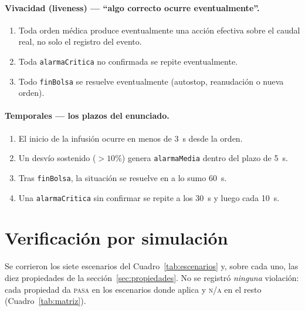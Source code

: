 \documentclass[11pt,a4paper]{article}
\begin{document}
\paragraph{Vivacidad (liveness) --- ``algo correcto ocurre eventualmente''.}
\begin{enumerate}[label=\textbf{L\arabic*.},leftmargin=2.6em]
  \item Toda orden médica produce eventualmente una acción efectiva sobre el caudal real, no solo el registro del evento.
  \item Toda \texttt{alarmaCritica} no confirmada se repite eventualmente.
  \item Todo \texttt{finBolsa} se resuelve eventualmente (autostop, reanudación o nueva orden).
\end{enumerate}

\paragraph{Temporales --- los plazos del enunciado.}
\begin{enumerate}[label=\textbf{T\arabic*.},leftmargin=2.6em]
  \item El inicio de la infusión ocurre en menos de 3~s desde la orden.
  \item Un desvío sostenido ($>10\%$) genera \texttt{alarmaMedia} dentro del plazo de 5~s.
  \item Tras \texttt{finBolsa}, la situación se resuelve en a lo sumo 60~s.
  \item Una \texttt{alarmaCritica} sin confirmar se repite a los 30~s y luego cada 10~s.
\end{enumerate}

\section{Verificación por simulación}\label{sec:resultados}

Se corrieron los siete escenarios del Cuadro~\ref{tab:escenarios} y, sobre cada uno, las diez propiedades de la sección~\ref{sec:propiedades}. No se registró \emph{ninguna} violación: cada propiedad da \textsc{pasa} en los escenarios donde aplica y \textsc{n/a} en el resto (Cuadro~\ref{tab:matriz}).
\end{document}
